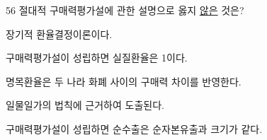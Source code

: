 \begin{question}{56}
절대적 구매력평가설에 관한 설명으로 옳지 \uline{않은} 것은?
\begin{choices}
  \item 장기적 환율결정이론이다.
  \item 구매력평가설이 성립하면 실질환율은 1이다.
  \item 명목환율은 두 나라 화폐 사이의 구매력 차이를 반영한다.
  \item 일물일가의 법칙에 근거하여 도출된다.
  \item 구매력평가설이 성립하면 순수출은 순자본유출과 크기가 같다.
\end{choices}
\end{question}
